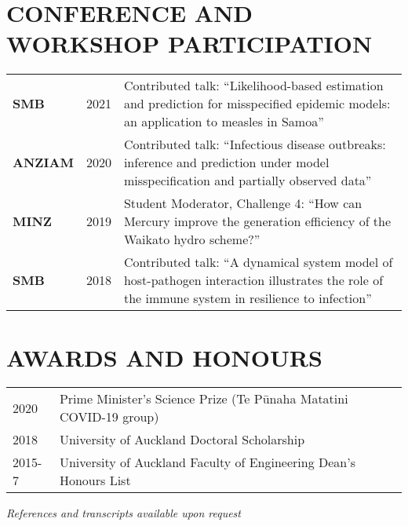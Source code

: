 \documentclass[paper=a4paper,fontsize=11pt]{scrartcl} %
\newlength{\spacebox}
\newcommand{\NewPart}[1]{\section*{\uppercase{#1}}}
\begin{document}
\NewPart{Conference and Workshop Participation}
\begin{tabular}{p{\spacebox} p{0.5\spacebox} p{6.7\spacebox}}
\textbf{SMB} & {2021} & {Contributed talk: ``Likelihood-based  estimation and prediction for misspecified epidemic models: an application to measles in Samoa''}\\
\textbf{ANZIAM} & {2020} & {Contributed talk: ``Infectious disease outbreaks: inference and prediction under model misspecification and partially observed data''}\\
\textbf{MINZ} & {2019} & {Student Moderator, Challenge 4: ``How can Mercury improve the generation efficiency of the Waikato hydro scheme?''}\\
\textbf{SMB} & {2018} & {Contributed talk: ``A dynamical system model of host-pathogen interaction illustrates the role of the immune system in resilience to infection''}\\
\end{tabular}

\NewPart{Awards and Honours}
\begin{tabular}{p{1.0\spacebox} p{6.7\spacebox}}
    2020 & Prime Minister's Science Prize (Te P\=unaha Matatini COVID-19 group)\\
    2018 & University of Auckland Doctoral Scholarship\\
    2015-7 & University of Auckland Faculty of Engineering Dean's Honours List\\
\end{tabular}

\vspace{1ex} \titlerule[2pt] \vspace{1ex}
\textit{References and transcripts available upon request}
\end{document}
